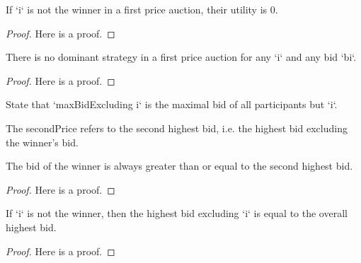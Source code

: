 \begin{lemma}\label{FirstPrice.utility_loser}
    \leanok
    If `i` is not the winner in a first price auction, their utility is 0.
\end{lemma}
\begin{proof}
    Here is a proof.
\end{proof}

\begin{theorem}\label{FirstPrice.firstprice_auction_has_no_dominant_strategy}
    \leanok
    There is no dominant strategy in a first price auction for any `i` and any bid `bi`.
\end{theorem}
\begin{proof}
    Here is a proof.
\end{proof}

\begin{definition}\label{maxBidExcluding}
    \leanok
    \uses{}
    State that `maxBidExcluding i` is the maximal bid of all participants but `i`.
\end{definition}

\begin{definition}\label{secondPrice}
    \leanok
    The secondPrice refers to the second highest bid, i.e. the highest bid excluding the winner’s bid.
\end{definition}

\begin{lemma}\label{maxBidExcluding_le_maxBid}
    \leanok
    The bid of the winner is always greater than or equal to the second highest bid.
\end{lemma}
\begin{proof}
    Here is a proof.
\end{proof}

\begin{lemma}\label{maxBidExcluding_eq_maxBid_if_loser}
    \leanok
    If `i` is not the winner, then the highest bid excluding `i` is equal to the overall highest bid.
\end{lemma}
\begin{proof}
    Here is a proof.
\end{proof}

